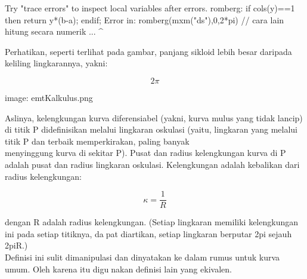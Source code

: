\documentclass[12pt,arial,letterpaper]{book}
\begin{document}
\begin{eulernootebook}
\begin{eulercomment}
\begin{eulercomment}
\begin{eulernootebook}
\begin{eulercomment}
\begin{eulercomment}
\begin{eulercomment}
\begin{eulercomment}
\begin{eulercomment}
\begin{eulercomment}
\begin{eulernotebook}
\begin{eulercomment}
\begin{eulercomment}
\begin{eulercomment}
\begin{eulercomment}
\begin{eulercomment}
\begin{eulercomment}
\begin{eulercomment}
\begin{eulercomment}
\begin{eulercomment}
\begin{eulercomment}
\begin{eulercomment}
\begin{eulercomment}
\begin{eulercomment}
\begin{eulercomment}
\begin{eulercomment}
\begin{eulercomment}
\begin{euleroutput}
  Try "trace errors" to inspect local variables after errors.
  romberg:
      if cols(y)==1 then return y*(b-a); endif;
  Error in:
  romberg(mxm("ds"),0,2*pi) // cara lain hitung secara numerik ...
                           ^
\end{euleroutput}
\begin{eulercomment}
Perhatikan, seperti terlihat pada gambar, panjang sikloid lebih besar
daripada keliling lingkarannya, yakni:\\
\end{eulercomment}
\begin{eulerformula}
\[
2\pi
\]
\end{eulerformula}
\begin{eulercomment}
\begin{eulercomment}
\begin{eulercomment}
image: emtKalkulus.png

Aslinya, kelengkungan kurva diferensiabel (yakni, kurva mulus yang
tidak lancip) di titik P didefinisikan melalui lingkaran oskulasi
(yaitu, lingkaran yang melalui titik P dan terbaik memperkirakan,
paling banyak\\
menyinggung kurva di sekitar P). Pusat dan radius kelengkungan kurva
di P adalah pusat dan radius lingkaran oskulasi. Kelengkungan adalah
kebalikan dari radius kelengkungan:


\end{eulercomment}
\begin{eulerformula}
\[
\kappa = \frac{1}{R}
\]
\end{eulerformula}
\begin{eulercomment}
dengan R adalah radius kelengkungan. (Setiap lingkaran memiliki
kelengkungan ini pada setiap titiknya, dapat diartikan, setiap
lingkaran berputar 2pi sejauh 2piR.)\\
Definisi ini sulit dimanipulasi dan dinyatakan ke dalam rumus untuk
kurva umum. Oleh karena itu digunakan definisi lain yang ekivalen.


\end{eulercomment}
\end{eulercomment}
\end{eulercomment}
\end{eulercomment}
\end{eulercomment}
\end{eulercomment}
\end{eulercomment}
\end{eulercomment}
\end{eulercomment}
\end{eulercomment}
\end{eulercomment}
\end{eulercomment}
\end{eulercomment}
\end{eulercomment}
\end{eulercomment}
\end{eulercomment}
\end{eulercomment}
\end{eulercomment}
\end{eulercomment}
\end{eulernotebook}
\end{eulercomment}
\end{eulercomment}
\end{eulercomment}
\end{eulercomment}
\end{eulercomment}
\end{eulercomment}
\end{eulernootebook}
\end{eulercomment}
\end{eulercomment}
\end{eulernootebook}
\end{document}
